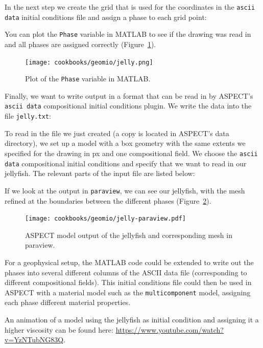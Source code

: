 \documentclass{article}
\newcommand{\aspect}{\textsc{ASPECT}}
\begin{document}
In the next step we create the grid that is used for the coordinates in the \texttt{ascii data} initial conditions file 
and assign a phase to each grid point: 

You can plot the \texttt{Phase} variable in MATLAB to see if the drawing was read in and all phases are assigned correctly 
(Figure~\ref{fig:jelly-plot}). 
\begin{figure}[tb]
    \centering
    \texttt{[image: cookbooks/geomio/jelly.png]}
    \caption{Plot of the \texttt{Phase} variable in MATLAB.}
    \label{fig:jelly-plot}
\end{figure}
Finally, we want to write output in a format that can be read in by \aspect{}'s \texttt{ascii data} compositional
initial conditions plugin. We write the data into the file \texttt{jelly.txt}:


To read in the file we just created (a copy is located in \aspect{}'s data directory), 
we set up a model with a box geometry with the same extents we specified for the drawing in px 
and one compositional field. We choose the \texttt{ascii data} compositional initial conditions and specify that we 
want to read in our jellyfish. The relevant parts of the input file are listed below:


If we look at the output in \texttt{paraview}, we can see our jellyfish, with the mesh refined at the 
boundaries between the different phases (Figure~\ref{fig:jelly-paraview}). 
\begin{figure}[tb]
    \centering
    \texttt{[image: cookbooks/geomio/jelly-paraview.pdf]}
    \caption{\aspect{} model output of the jellyfish and corresponding mesh in paraview.}
    \label{fig:jelly-paraview}
\end{figure}

For a geophysical setup, the MATLAB code could be extended to write out the phases into several different columns 
of the ASCII data file (corresponding to different compositional fields). This initial conditions file could then be 
used in \aspect{} with a material model such as the \texttt{multicomponent} model, assigning each phase different 
material properties. 

An animation of a model using the jellyfish as initial condition and assigning it a higher viscosity can be found here: \url{https://www.youtube.com/watch?v=YzNTubNG83Q}. 
\end{document}
